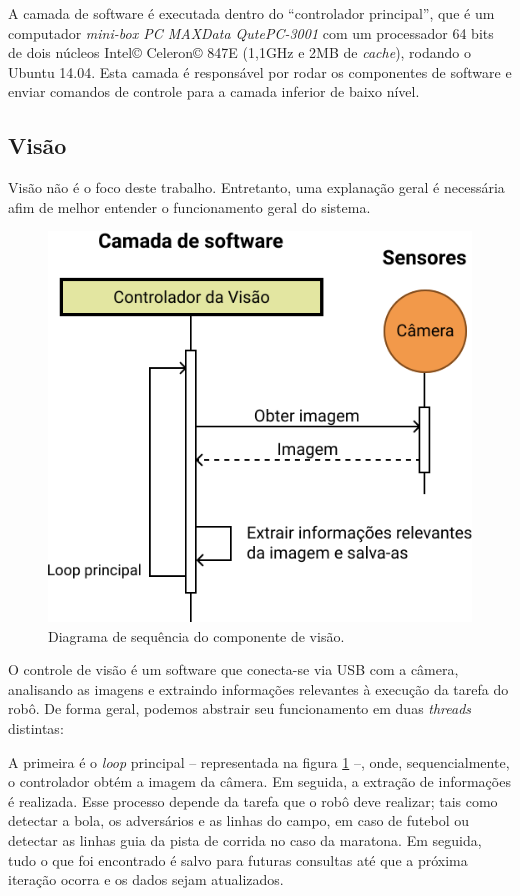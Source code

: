 A camada de software é executada dentro do ``controlador principal'', que é um computador \textit{mini-box PC MAXData QutePC-3001} com um processador 64 bits de dois núcleos Intel\copyright{} Celeron\copyright{} 847E (1,1GHz e 2MB de \textit{cache}), rodando o Ubuntu 14.04. Esta camada é responsável por rodar os componentes de software e enviar comandos de controle para a camada inferior de baixo nível.

\subsection{Visão}

Visão não é o foco deste trabalho. Entretanto, uma explanação geral é necessária afim de melhor entender o funcionamento geral do sistema.

\begin{figure}[h!]
	\centering
	\includegraphics[scale=1]{imagens/svg/softwarearchitecture-vision}
	\caption{Diagrama de sequência do componente de visão.}
	\label{fig:softwarearchitecture:vision}
\end{figure}

O controle de visão é um software que conecta-se via USB com a câmera, analisando as imagens e extraindo informações relevantes à execução da tarefa do robô. De forma geral, podemos abstrair seu funcionamento em duas \textit{threads} distintas:

A primeira é o \textit{loop} principal -- representada na figura \ref{fig:softwarearchitecture:vision} --, onde, sequencialmente, o controlador obtém a imagem da câmera. Em seguida, a extração de informações é realizada. Esse processo depende da tarefa que o robô deve realizar; tais como detectar a bola, os adversários e as linhas do campo, em caso de futebol ou detectar as linhas guia da pista de corrida no caso da maratona. Em seguida, tudo o que foi encontrado é salvo para futuras consultas até que a próxima iteração ocorra e os dados sejam atualizados.


